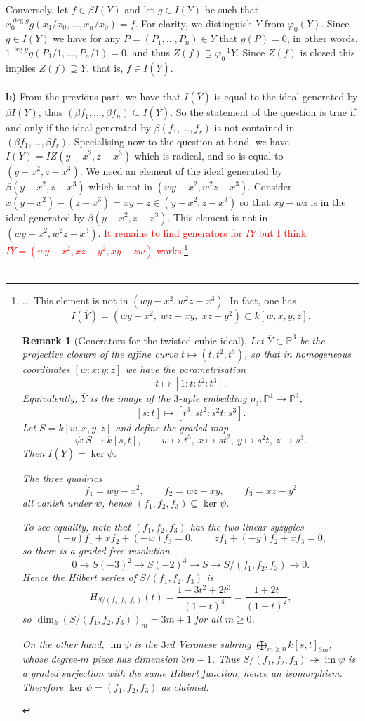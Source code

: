\documentclass[12pt]{article}
\numberwithin{thm}{subsection}
\numberwithin{defn}{subsection}
\numberwithin{lemma}{subsection}
\numberwithin{example}{subsection}
\numberwithin{notation}{subsection}
\numberwithin{cor}{subsection}
\newtheorem{remark}{Remark}
\numberwithin{remark}{subsection}
\numberwithin{condition}{subsection}
\numberwithin{question}{subsection}
\numberwithin{construction}{subsection}
\numberwithin{construction}{subsection}
\numberwithin{construction}{subsection}
\newcommand{\bb}[1]{\mathbb{#1}}
\newcommand{\im}{\operatorname{im}}
\begin{document}
Conversely, let $f \in \beta I(Y)$ and let $g \in I(Y)$ be such that $x_0^{\operatorname{deg}g}g(x_1/x_0,...,x_n/x_0) = f$. For clarity, we distinguish $Y$ from $\varphi_0(Y)$. Since $g \in I(Y)$ we have for any $P = (P_1,...,P_n) \in Y$ that $g(P) = 0$, in other words, $1^{\operatorname{deg}g}g(P_1/1,...,P_n/1) = 0$, and thus $Z(f) \supseteq \varphi_0^{-1}Y$. Since $Z(f)$ is closed this implies $Z(f) \supseteq \bar{Y}$, that is, $f \in I(\bar{Y})$.\\\\
%
\textbf{b)} From the previous part, we have that $I(\bar{Y})$ is equal to the ideal generated by $\beta I(Y)$, thus $(\beta f_1,...,\beta f_n) \subseteq I(\bar{Y})$. So the statement of the question is true if and only if the ideal generated by $\beta (f_1,...,f_r)$ is not contained in $(\beta f_1,..., \beta f_r)$. Specialising now to the question at hand, we have $I(Y) = IZ(y - x^2, z - x^3)$ which is radical, and so is equal to $(y-x^2, z-x^3)$. We need an element of the ideal generated by $\beta (y - x^2, z - x^3)$ which is not in $(wy - x^2, w^2z - x^3)$. Consider $x(y - x^2) - (z - x^3) = xy - z \in (y - x^2, z - x^3)$ so that $xy - wz$ is in the ideal generated by $\beta (y - x^2, z-x^3)$. This element is not in $(wy - x^2, w^2z - x^3)$. \textcolor{red}{It remains to find generators for $I\bar{Y}$ but I think $I\bar{Y} = (wy-x^2, xz - y^2, xy - zw)$ works.}\footnote{... This element is not in $(wy - x^2, w^2z - x^3)$. In fact, one has
\[
I(\overline{Y}) = (wy-x^2,\; wz-xy,\; xz-y^2)\subset k[w,x,y,z].
\]

\begin{remark}[Generators for the twisted cubic ideal]
\label{rem:twisted_cubic_generators}
Let $\overline{Y}\subset \bb{P}^3$ be the projective closure of the affine curve
$t\mapsto (t,t^2,t^3)$, so that in homogeneous coordinates $[w:x:y:z]$ we have the parametrisation
\[
t\longmapsto [1:t:t^2:t^3].
\]
Equivalently, $\overline{Y}$ is the image of the $3$-uple embedding $\rho_3:\bb{P}^1\to \bb{P}^3$,
\[
[s:t]\longmapsto [t^3:st^2:s^2t:s^3].
\]
Let $S=k[w,x,y,z]$ and define the graded map
\[
\psi:S\to k[s,t],\qquad w\mapsto t^3,\ x\mapsto st^2,\ y\mapsto s^2t,\ z\mapsto s^3.
\]
Then $I(\overline{Y})=\ker\psi$.

The three quadrics
\[
f_1=wy-x^2,\qquad f_2=wz-xy,\qquad f_3=xz-y^2
\]
all vanish under $\psi$, hence $(f_1,f_2,f_3)\subseteq \ker\psi$.

To see equality, note that $(f_1,f_2,f_3)$ has the two linear syzygies
\[
(-y)f_1 + x f_2 + (-w)f_3 = 0,\qquad
z f_1 + (-y)f_2 + x f_3 = 0,
\]
so there is a graded free resolution
\[
0\to S(-3)^2 \to S(-2)^3 \to S \to S/(f_1,f_2,f_3)\to 0.
\]
Hence the Hilbert series of $S/(f_1,f_2,f_3)$ is
\[
H_{S/(f_1,f_2,f_3)}(t)=\frac{1-3t^2+2t^3}{(1-t)^4}=\frac{1+2t}{(1-t)^2},
\]
so $\dim_k(S/(f_1,f_2,f_3))_m = 3m+1$ for all $m\ge 0$.

On the other hand, $\im\psi$ is the $3$rd Veronese subring
$\bigoplus_{m\ge 0}k[s,t]_{3m}$, whose degree-$m$ piece has dimension $3m+1$.
Thus $S/(f_1,f_2,f_3)\twoheadrightarrow \im\psi$ is a graded surjection with the same Hilbert function,
hence an isomorphism. Therefore $\ker\psi=(f_1,f_2,f_3)$ as claimed.
\end{remark}}\\\\
\end{document}
